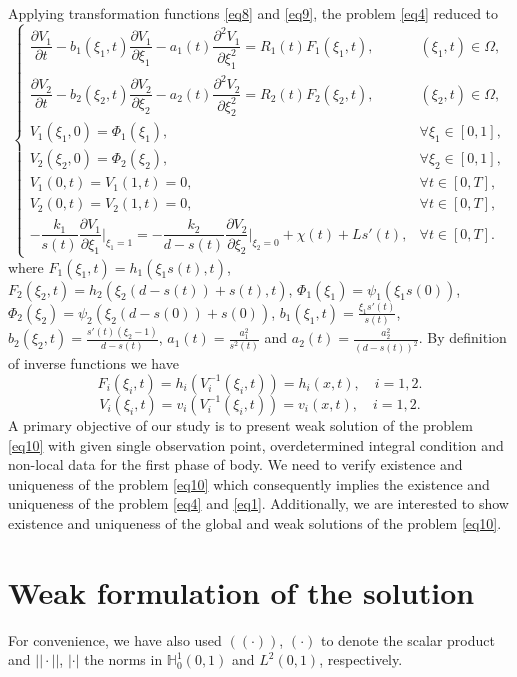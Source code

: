 \documentclass[preprint,12pt,authoryear]{elsarticle}
\begin{document}
Applying transformation functions \eqref{eq8} and \eqref{eq9}, the problem \eqref{eq4} reduced to
\begin{equation}\label{eq10}
    \begin{cases}
        \dfrac{\partial V_1}{\partial t}-b_1(\xi_1,t)\dfrac{\partial V_1}{\partial \xi_1}-a_1(t)\dfrac{\partial^2 V_1}{\partial\xi_1^2}=R_1(t)F_1(\xi_1,t),& (\xi_1,t)\in\Omega,\\
        \dfrac{\partial V_2}{\partial t}-b_2(\xi_2,t)\dfrac{\partial V_2}{\partial \xi_2}-a_2(t)\dfrac{\partial^2 V_2}{\partial\xi_2^2}=R_2(t)F_2(\xi_2,t),& (\xi_2,t)\in\Omega,\\
        V_1(\xi_1,0)=\Phi_1(\xi_1),&\forall\xi_1\in[0,1],\\
        V_2(\xi_2,0)=\Phi_2(\xi_2),&\forall\xi_2\in[0,1],\\
        V_1(0,t)=V_1(1,t)=0,&\forall t\in[0,T],\\
        V_2(0,t)=V_2(1,t)=0,&\forall t\in[0,T],\\
        -\dfrac{k_1}{s(t)}\dfrac{\partial V_1}{\partial \xi_1}\bigg|_{\xi_1=1}=-\dfrac{k_2}{d-s(t)}\dfrac{\partial V_2}{\partial\xi_2}\bigg|_{\xi_2=0}+\chi(t)+Ls'(t),& \forall t\in[0,T].
    \end{cases}
\end{equation}
where $F_1(\xi_1,t)=h_1(\xi_1s(t),t)$, $F_2(\xi_2,t)=h_2(\xi_2(d-s(t))+s(t),t)$, $\Phi_1(\xi_1)=\psi_1(\xi_1s(0))$, $\Phi_2(\xi_2)=\psi_2(\xi_2(d-s(0))+s(0))$, $b_1(\xi_1,t)=\frac{\xi_1s'(t)}{s(t)}$, $b_2(\xi_2,t)=\frac{s'(t)(\xi_2-1)}{d-s(t)}$, $a_1(t)=\frac{a_1^2}{s^2(t)}$ and $a_2(t)=\frac{a_2^2}{(d-s(t))^2}$. By definition of inverse functions we have
$$F_i(\xi_i,t)=h_i(V_i^{-1}(\xi_i,t))=h_i(x,t),\quad i=1,2.$$
$$V_i(\xi_i,t)=v_i(V_i^{-1}(\xi_i,t))=v_i(x,t),\quad i=1,2.$$
A primary objective of our study is to present weak solution of the problem \eqref{eq10} with given single observation point, overdetermined integral condition and non-local data for the first phase of body. We need to verify existence and uniqueness of the problem \eqref{eq10} which consequently implies the existence and uniqueness of the problem \eqref{eq4} and \eqref{eq1}. Additionally, we are interested to show existence and uniqueness of the global and weak solutions of the problem \eqref{eq10}. 


\section{Weak formulation of the solution}
For convenience, we have also used  
$((\cdot))$, $(\cdot)$  to denote the scalar product and $||\cdot||$, $|\cdot|$ the norms in $\mathbb{H}_0^1(0,1)$ and $L^2(0,1)$, respectively.
\end{document}
